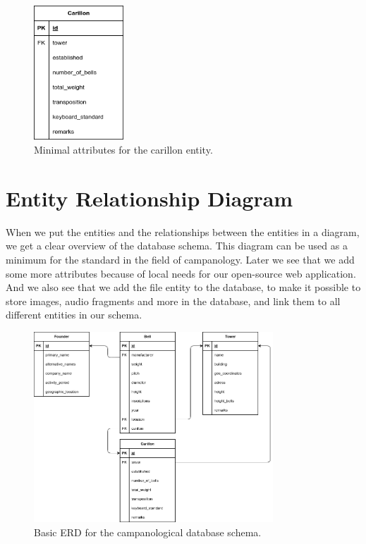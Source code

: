 \documentclass[11pt, a4paper]{article}
\begin{document}
\begin{figure}[h!]
    \centering
    \includegraphics[width=0.3\textwidth]{images/carillon.png}
    \caption{Minimal attributes for the carillon entity.}
    \label{fig:carillon-entity}
\end{figure}

\section{Entity Relationship Diagram}

When we put the entities and the relationships between the entities in a diagram, we get a clear overview of the database schema. This diagram can be used as a minimum for the standard in the field of campanology. Later we see that we add some more attributes because of local needs for our open-source web application. And we also see that we add the file entity to the database, to make it possible to store images, audio fragments and more in the database, and link them to all different entities in our schema.

\clearpage

\begin{figure}[h!]
    \centering
    \includegraphics[width=0.8\textwidth]{images/basic_erd.png}
    \caption{Basic ERD for the campanological database schema.}
    \label{fig:basic-erd}
\end{figure}
\end{document}
